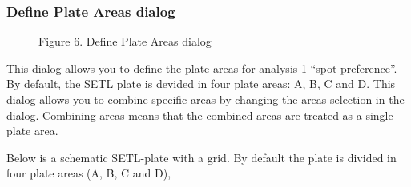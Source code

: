 \documentclass[letterpaper,10pt,english]{sphinxmanual}
\begin{document}
\subsubsection{Define Plate Areas dialog}
\label{user_manual:define-plate-areas-dialog}\label{user_manual:dialog-define-plate-areas}\begin{figure}[htbp]
\centering
\capstart

\caption{Figure 6. Define Plate Areas dialog}\end{figure}

This dialog allows you to define the plate areas for analysis 1
``spot preference''. By default, the SETL plate is devided in four plate
areas: A, B, C and D. This dialog allows you to combine specific areas by
changing the areas selection in the dialog. Combining areas means that
the combined areas are treated as a single plate area.

Below is a schematic SETL-plate with a grid. By default the plate is
divided in four plate areas (A, B, C and D),
\begin{figure}[htbp]
\centering

\end{figure}
\end{document}
